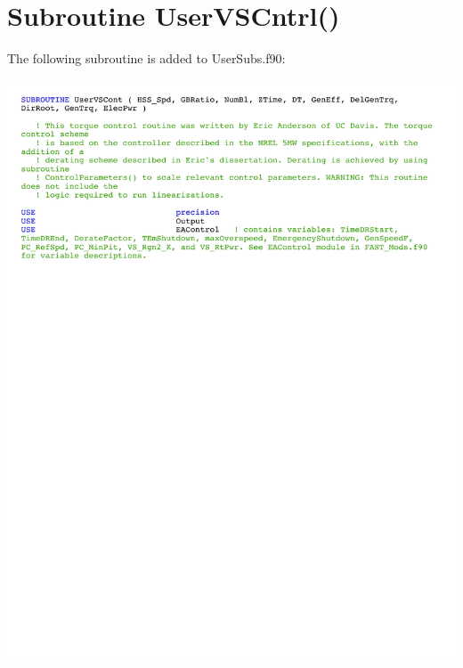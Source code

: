 \section{Subroutine UserVSCntrl()} \label{sectionD-2}
The following subroutine is added to UserSubs.f90:

\noindent
\includegraphics[width=\linewidth]{Figures/AppendixDFigures/figD-2A.pdf}

